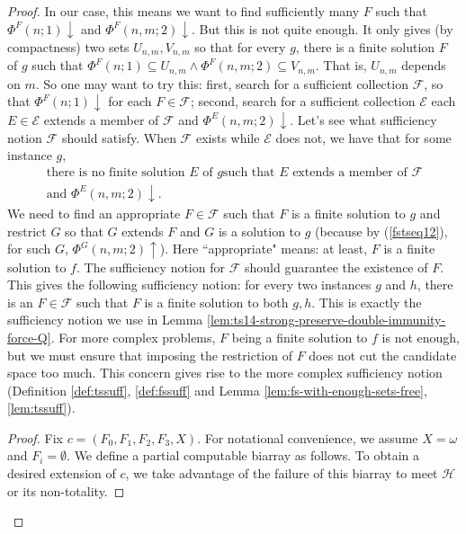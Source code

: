 \documentclass{amsart}
\theoremstyle{definition}
\theoremstyle{remark}
\numberwithin{equation}{section}
\theoremstyle{noparens}
\def\mcal{\mathcal}
\newcommand{\Hcal}{\mathcal{H}}
\begin{document}
\begin{proof}
In our case, this means we want to find sufficiently many $F$ such that
$\Phi^F(n;1)\downarrow$ and $\Phi^F(n,m;2)\downarrow$.
But this is not quite enough. It only gives (by compactness) two sets
$U_{n,m},V_{n,m}$ so that for every $g$, there is a finite solution $F$
of $g$
 such that $\Phi^F(n;1)\subseteq U_{n,m}\wedge \Phi^F(n,m;2)\subseteq V_{n,m}$.
That is, $U_{n,m}$ depends on $m$.
So one may want to try this: first, search for a sufficient collection $\mcal{F}$, so that
$\Phi^F(n;1)\downarrow$ for each $F\in\mcal{F}$;
second, search for a sufficient collection $\mcal{E}$ each $E\in\mcal{E}$ extends a member of $\mcal{F}$
and $\Phi^E(n,m;2)\downarrow$.
Let's see what sufficiency notion  $\mcal{F}$ should satisfy. When $\mcal{F}$ exists while $\mcal{E}$
does not, we have that for some instance $g$,
\begin{align}\label{fstseq12}
&\text{there is no finite solution $E$ of $g$
such that $E$ extends a member of $\mcal{F}$ }\\ \nonumber
&\text{and $\Phi^E(n,m;2)\downarrow$.}
\end{align}
We need to
find an  appropriate $F\in\mcal{F}$ such that $F$ is a finite solution to $g$ and
 restrict $G$ so that $G$ extends $F$ and $G$ is a solution to $g$
 (because by (\ref{fstseq12}), for such $G$, $\Phi^G(n,m;2)\uparrow$).
 Here ``appropriate" means: at least, $F$ is a finite solution to $f$.
 The sufficiency notion for $\mcal{F}$ should guarantee the existence of $F$.
This gives the following sufficiency notion:
 for every two instances $g$ and $h$, there is an $F\in\mcal{F}$ such that $F$
 is a finite solution to both $g,h$.
 This is exactly the sufficiency notion we use in Lemma \ref{lem:ts14-strong-preserve-double-immunity-force-Q}.
 For more complex problems, $F$ being a finite solution to $f$ is not enough, but
  we must ensure that imposing the restriction of $F$
 does not cut the candidate space too much. This concern gives rise
 to the more complex sufficiency notion (Definition \ref{def:tssuff}, \ref{def:fssuff}
 and Lemma \ref{lem:fs-with-enough-sets-free}, \ref{lem:tssuff}).

\begin{proof}
Fix $c = (F_0, F_1, F_2, F_3, X)$.
For notational convenience, we assume $X=\omega$ and $F_i = \emptyset$.
We  define %
 a partial computable biarray as follows.
 To obtain a desired extension of $c$, we take advantage
 of the failure of this biarray to meet $\Hcal$ or its non-totality.
\bigskip


\end{proof}
\end{proof}
\end{document}
